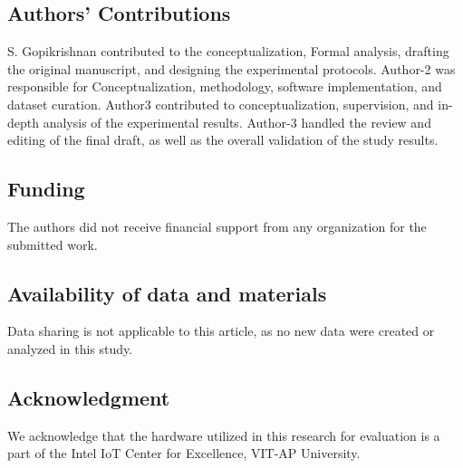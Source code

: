 \documentclass[a4paper,fleqn]{cas-dc}
\numberwithin{equation}{section}
\begin{document}
\subsection*{Authors' Contributions}
S. Gopikrishnan contributed to the conceptualization, Formal analysis, drafting the original manuscript, and designing the experimental protocols. Author-2 was responsible for Conceptualization, methodology, software implementation, and dataset curation. Author3 contributed to conceptualization, supervision, and in-depth analysis of the experimental results. Author-3 handled the review and editing of the final draft, as well as the overall validation of the study results.


\subsection*{Funding}
The authors did not receive financial support from any organization for the submitted work.

\subsection*{Availability of data and materials}
Data sharing is not applicable to this article, as no new data were created or analyzed in this study.

\subsection*{Acknowledgment}
We acknowledge that the hardware utilized in this research for evaluation is a part of the Intel IoT Center for Excellence, VIT-AP University. 



\end{document}

